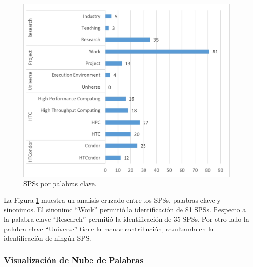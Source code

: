 \begin{figure}[htbp]
	\centering
	\vspace{10pt}
	\includegraphics[scale=0.7]{resources/figures/SPSsByKeywords.jpg}
	\vspace{6pt}
	\caption{SPSs por palabras clave.}
	\label{fig:SPSsByKeywords}
\end{figure}

La Figura \ref{fig:SPSsByKeywords} muestra un analisis cruzado entre los SPSs, palabras clave y sinonimos. El sinonimo ``Work'' permitió la identificación de 81 SPSs. Respecto a la palabra clave ``Research'' permitió la identificación de 35 SPSs. Por otro lado la palabra clave ``Universe'' tiene la menor contribución, resultando en la identificación de ningún SPS.

\subsubsection{Visualización de Nube de Palabras}

